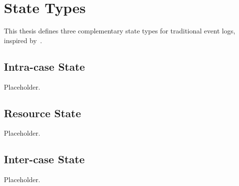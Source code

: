 \chapter{State Types}
\label{chap:state_types}

This thesis defines three complementary state types for traditional event logs,
inspired by~\autocite{berti2025ocel}.

\section{Intra-case State}
\label{sec:state_types:intra_case}
Placeholder.

\section{Resource State}
\label{sec:state_types:resource}
Placeholder.

\section{Inter-case State}
\label{sec:state_types:inter_case}
Placeholder.
